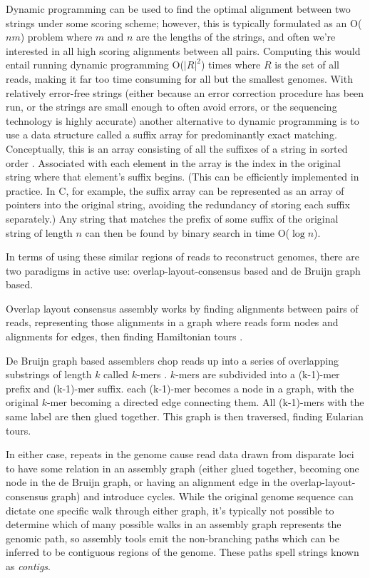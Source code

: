 Dynamic programming can be used to find the optimal alignment between two strings under some scoring scheme; however, this is typically formulated as an O($nm$) problem where $m$ and $n$ are the lengths of the strings, and often we're interested in all high scoring alignments between all pairs.  Computing this would entail running dynamic programming O($|R|^2$) times where $R$ is the set of all reads, making it far too time consuming for all but the smallest genomes.
With relatively error-free strings (either because an error correction procedure has been run, or the strings are small enough to often avoid errors, or the sequencing technology is highly accurate) another alternative to dynamic programming is to use a data structure called a suffix array for predominantly exact matching.
Conceptually, this is an array consisting of all the suffixes of a string in sorted order \cite{manber1993suffix}.
Associated with each element in the array is the index in the original string where that element's suffix begins.
(This can be efficiently implemented in practice. In C, for example, the suffix array can be represented as an array of pointers into the original string, avoiding the redundancy of storing each suffix separately.)
Any string that matches the prefix of some suffix of the original string of length $n$ can then be found by binary search in time O($\log n$).  

In terms of using these similar regions of reads to reconstruct genomes, there are two paradigms in active use: overlap-layout-consensus based and de Bruijn graph based.

Overlap layout consensus assembly works by finding alignments between pairs of reads, representing those alignments in a graph where reads form nodes and alignments for edges, then finding Hamiltonian tours \cite{myers1995toward}.  


De Bruijn graph based assemblers chop reads up into a series of overlapping substrings of length $k$ called $k$-mers \cite{pevzner2001eulerian}.
$k$-mers are subdivided into a (k-1)-mer prefix and (k-1)-mer suffix.
each (k-1)-mer becomes a node in a graph, with the original $k$-mer becoming a directed edge connecting them.
All (k-1)-mers with the same label are then glued together.  This graph is then traversed, finding Eularian tours.  

In either case, repeats in the genome cause read data drawn from disparate loci to have some relation in an assembly graph (either glued together, becoming one node in the de Bruijn graph, or having an alignment edge in the overlap-layout-consensus graph) and introduce cycles.
While the original genome sequence can dictate one specific walk through either graph, it's typically not possible to determine which of many possible walks in an assembly graph represents the genomic path, so assembly tools emit the non-branching paths which can be inferred to be contiguous regions of the genome.
These paths spell strings known as \emph{contigs}.

